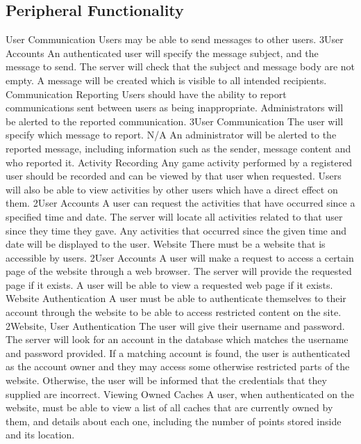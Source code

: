 	\subsection{Peripheral Functionality}
		\funcreq
			{User Communication}
			{Users may be able to send messages to other users.}
			{3}{User Accounts}
			{An authenticated user will specify the message subject, and the
			message to send.}
			{The server will check that the subject and message body are not
			empty.}
			{A message will be created which is visible to all intended
			recipients.}
		\funcreq
			{Communication Reporting}
			{Users should have the ability to report communications sent
			between users as being inappropriate. Administrators will be
			alerted to the reported communication.}
			{3}{User Communication}
			{The user will specify which message to report.}
			{N/A}
			{An administrator will be alerted to the reported message,
			including information such as the sender, message content and who
			reported it.}
		\funcreq
			{Activity Recording}
			{Any game activity performed by a registered user should be
			recorded and can be viewed by that user when requested. Users will
			also be able to view activities by other users which have a direct
			effect on them.}
			{2}{User Accounts}
			{A user can request the activities that have occurred since a
			specified time and date.}
			{The server will locate all activities related to that user since
			they time they gave.}
			{Any activities that occurred since the given time and date will
			be displayed to the user.}
		\funcreq
			{Website}
			{There must be a website that is accessible by users.}
			{2}{User Accounts}
			{A user will make a request to access a certain page of the website
			through a web browser.}
			{The server will provide the requested page if it exists.}
			{A user will be able to view a requested web page if it exists.}
		\funcreq
			{Website Authentication}
			{A user must be able to authenticate themselves to their account
			through the website to be able to access restricted content on the
			site.}
			{2}{Website, User Authentication}
			{The user will give their username and password.}
			{The server will look for an account in the database which matches
			the username and password provided.}
			{If a matching account is found, the user is authenticated as 
			the account owner and they may access some otherwise restricted 
			parts of the website. Otherwise, the user will be informed that the
			credentials that they supplied are incorrect.}
		\funcreq
			{Viewing Owned Caches}
			{A user, when authenticated on the website, must be able to view a
			list of all caches that are currently owned by them, and details
			about each one, including the number of points stored inside and
			its location.}
